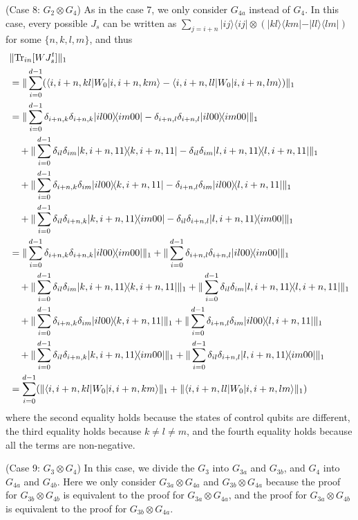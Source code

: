 \documentclass[a4paper,twocolumn,accepted=2022-10-23]{quantumarticle}
\newcommand{\bra}[1]{\langle {#1} \vert}
\newcommand{\ket}[1]{\vert {#1} \rangle}
\newcommand{\ketbra}[2]{\vert {#1} \rangle\!\langle {#2} \vert}
\newcommand{\Tr}[0]{{\mathrm{Tr}}}
\theoremstyle{definition}
\begin{document}
(Case 8: $G_2 \otimes G_4$) \quad
As in the case 7, we only consider $G_{4a}$ instead of $G_4$.
In this case, every possible $J_s$ can be written as $\sum_{j=i+n} \ketbra{ij}{ij} \otimes (\ketbra{kl}{km} - \ketbra{ll}{lm} )$ for some $\{n,k,l,m\}$, and thus
\begin{align}
& \| \Tr_{in} [W J_s^t] \|_1 \notag \\
&= \| \sum_{i=0}^{d-1} (\bra{i,i+n,kl} {W_0} \ket{i,i+n,km} - \bra{i,i+n,ll} {W_0} \ket{i,i+n,lm})  \|_1 \\
%
&= \| \sum_{i=0}^{d-1}  \delta_{i+n,k}\delta_{i+n,k} \ketbra{il00}{im00} - \delta_{i+n,l}\delta_{i+n,l} \ketbra{il00}{im00} \|_1 \notag \\
&\quad + \| \sum_{i=0}^{d-1} \delta_{il}\delta_{im} \ketbra{k,i+n,11}{k,i+n,11} - \delta_{il}\delta_{im} \ketbra{l,i+n,11}{l,i+n,11} \|_1 \notag \\
&\quad + \| \sum_{i=0}^{d-1} \delta_{i+n,k}\delta_{im} \ketbra{il00}{k,i+n,11} - \delta_{i+n,l}\delta_{im} \ketbra{il00}{l,i+n,11} \|_1  \notag \\
&\quad + \| \sum_{i=0}^{d-1} \delta_{il}\delta_{i+n,k} \ketbra{k,i+n,11}{im00} - \delta_{il}\delta_{i+n,l} \ketbra{l,i+n,11}{im00} \|_1 \\
%
&= \| \sum_{i=0}^{d-1} \delta_{i+n,k}\delta_{i+n,k} \ketbra{il00}{im00} \|_1 + \| \sum_{i=0}^{d-1} \delta_{i+n,l}\delta_{i+n,l} \ketbra{il00}{im00} \|_1 \notag \\
&\quad + \| \sum_{i=0}^{d-1} \delta_{il}\delta_{im} \ketbra{k,i+n,11}{k,i+n,11} \|_1 + \| \sum_{i=0}^{d-1} \delta_{il}\delta_{im} \ketbra{l,i+n,11}{l,i+n,11} \|_1 \notag \\
&\quad + \| \sum_{i=0}^{d-1} \delta_{i+n,k}\delta_{im} \ketbra{il00}{k,i+n,11} \|_1 + \| \sum_{i=0}^{d-1} \delta_{i+n,l}\delta_{im} \ketbra{il00}{l,i+n,11} \|_1  \notag \\
&\quad + \| \sum_{i=0}^{d-1} \delta_{il}\delta_{i+n,k} \ketbra{k,i+n,11}{im00} \|_1 + \| \sum_{i=0}^{d-1}  \delta_{il}\delta_{i+n,l} \ketbra{l,i+n,11}{im00} \|_1 \\
%
&= \sum_{i=0}^{d-1} (\|  \bra{i,i+n,kl} {W_0} \ket{i,i+n,km} \|_1 + \| \bra{i,i+n,ll} {W_0} \ket{i,i+n,lm}  \|_1 )
\end{align}
where the second equality holds because the states of control qubits are different,
the third equality holds because $k \neq l \neq m$,
and the fourth equality holds because all the terms are non-negative.




(Case 9: $G_3 \otimes G_4$) \quad
In this case, we divide the $G_3$ into $G_{3a}$ and $G_{3b}$, and $G_4$ into $G_{4a}$ and $G_{4b}$.
Here we only consider $G_{3a} \otimes G_{4a}$ and $G_{3b} \otimes G_{4a}$
because the proof for $G_{3b} \otimes G_{4b}$ is equivalent to the proof for $G_{3a} \otimes G_{4a}$,
and the proof for $G_{3a} \otimes G_{4b}$ is equivalent to the proof for $G_{3b} \otimes G_{4a}$.
\end{document}
